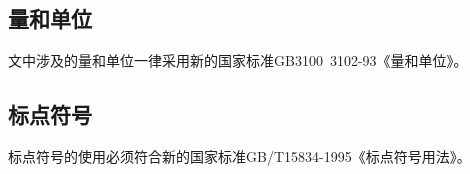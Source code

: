 \subsection{量和单位}
文中涉及的量和单位一律采用新的国家标准GB3100~3102-93《量和单位》。

\subsection{标点符号}
标点符号的使用必须符合新的国家标准GB/T15834-1995《标点符号用法》。
